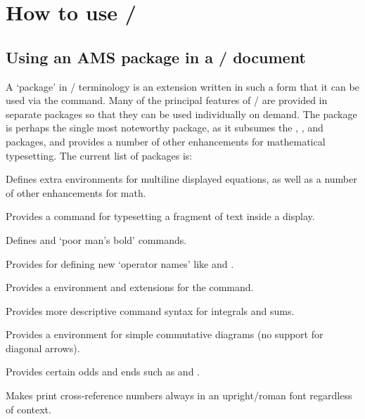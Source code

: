 \documentclass[leqno,titlepage,openany]{amsldoc}
\begin{document}
\chapter{How to use \amslatex/}

\section{Using an AMS package in a \latex/ document}\label{usepackage}

A `package'
in \latex/ terminology is an extension written in such a
form that it can be used via the  command. Many of the
principal features of \amslatex/ are provided in separate packages so
that they can be used individually on demand. The  package
is perhaps the single most noteworthy package, as it subsumes the
, , and  packages, and provides a
number of other enhancements for mathematical typesetting.
The current list of packages is:
\begin{description}
\raggedright
\item[\pkg{amsmath}] Defines extra environments for multiline displayed
  equations, as well as a number of other enhancements for math.

\item[\pkg{amstext}] Provides a  command for
  typesetting a fragment of text inside a display.

\item[\pkg{amsbsy}] Defines  and  `poor man's
  bold' commands.

\item[\pkg{amsopn}] Provides  for defining new
  `operator names' like  and .

\item[\pkg{amsthm}] Provides a  environment and
  extensions for the  command.

\item[\pkg{amsintx}] Provides more descriptive command syntax for
  integrals and sums.

\item[\pkg{amscd}] Provides a  environment for simple commutative
diagrams (no support for diagonal arrows).

\item[\pkg{amsxtra}] Provides certain odds and ends such as 
and .

\item[\pkg{upref}] Makes  print cross-reference numbers always
in an upright/roman font regardless of context.

\end{description}
\end{document}
